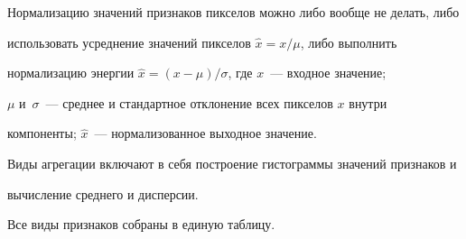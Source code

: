Нормализацию значений признаков пикселов можно либо вообще не делать, либо 


использовать усреднение значений пикселов $\hat{x}=x/\mu$, либо выполнить 


нормализацию энергии $\hat{x}=(x-\mu)/\sigma$, где $x$~--- входное значение; 


$\mu$ и~$\sigma$~--- среднее и стандартное отклонение всех пикселов $x$ внутри 


компоненты; $\hat{x}$~--- нормализованное выходное значение.





Виды агрегации включают в себя построение гистограммы значений признаков и 


вычисление среднего и дисперсии.





Все виды признаков собраны в единую таблицу.





